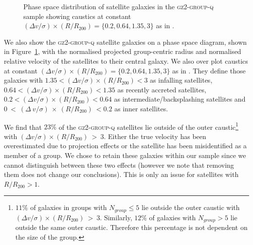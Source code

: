 \documentclass[useAMS,usenatbib]{mn2e}
\def\minor		{\color{minorcol}}
\begin{document}
\begin{figure}
\caption[]{Phase space distribution of satellite galaxies in the \textsc{gz2-group-q} sample showing caustics at constant $(\Delta v/\sigma)\times(R/R_{200}) = \{0.2, 0.64, 1.35, 3\}$ as in \cite{noble16}.}
\label{fig:phasespace}
\end{figure}

We also show the \textsc{gz2-group-q} satellite galaxies on a phase space diagram, shown in Figure~\ref{fig:phasespace}, with the normalised projected group-centric radius and normalised relative velocity of the satellites to their central galaxy. We also over plot caustics at constant $(\Delta v/\sigma)\times(R/R_{200}) = \{0.2, 0.64, 1.35, 3\}$ as in \cite{noble16}. They define those galaxies with $1.35<(\Delta v/\sigma)\times(R/R_{200})<3$ as infalling satellites, $0.64<(\Delta v/\sigma)\times(R/R_{200})<1.35$ as recently accreted satellites, $0.2<(\Delta v/\sigma)\times(R/R_{200})<0.64$ as intermediate/backsplashing satellites and $0~<~(\Delta~v/\sigma)~\times~(R/R_{200})~<0.2$ as inner satellites. 

We find that $23\%$ of the \textsc{gz2-group-q} satellites lie outside of the outer caustic\footnote{{\minor$11\%$ of galaxies in groups with $N_{group} \leq 5$ lie outside the outer caustic with $(\Delta v/\sigma)\times(R/R_{200})~>~3$. Similarly, $12\%$ of galaxies with $N_{group} > 5$ lie outside the same outer caustic. Therefore this percentage is not dependent on the size of the group.}} with $(\Delta v/\sigma)\times(R/R_{200})~>~3$. Either the true velocity has been overestimated due to projection effects or the satellite has been misidentified as a member of a group. We chose to retain these galaxies within our sample since we cannot distinguish between these two effects (however we note that removing them does not change our conclusions). This is only an issue for satellites with $R/R_{200} > 1$.
\end{document}
